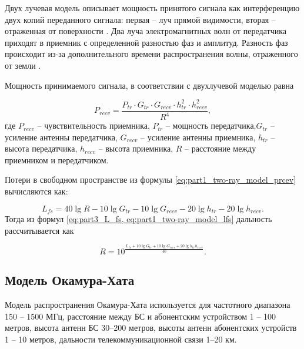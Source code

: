Двух лучевая модель описывает мощность принятого сигнала как интерференцию двух копий переданного сигнала: первая -- луч прямой видимости, вторая -- отраженная от поверхности \cite{Gaitan2020}. 
Два луча электромагнитных волн от передатчика приходят в приемник с определенной разностью фаз и амплитуд. Разность фаз происходит из-за дополнительного времени распространения волны, отраженного от земли \cite{Rademacher2016, Bacco2014, Zochmann2017, Kurt2017}. 


Мощность принимаемого сигнала, в соответствии с двухлучевой моделью равна

\begin{equation}
  \label{eq:part1_two-ray_model_prcev}
  P_{recv} = \frac{P_{tr} \cdot G_{tr} \cdot G_{recv} \cdot h^2_{tr} \cdot h^2_{recv}}{R^4},
\end{equation}
где $P_{recv}$ -- чувствительность приемника, $P_{tr}$ -- мощность передатчика,$G_{tr}$ -- усиление антенны передатчика, $G_{recv}$ -- усиление антенны приемника, $h_{tr}$ -- высота передатчика, $h_{recv}$ -- высота приемника, $R$ -- расстояние между приемником и передатчиком.

Потери в свободном пространстве из формулы \cref{eq:part1_two-ray_model_prcev} вычисляются как:

\begin{equation}
  \label{eq:part1_two-ray_model_lfs}
  L_{fs} = 40\lg{R} - 10\lg{G_{tr}} - 10\lg{G_{recv}} - 20\lg{h_{tr}} - 20\lg{h_{recv}}.
\end{equation}
Тогда из формул \cref{eq:part3_L_fs, eq:part1_two-ray_model_lfs} дальность рассчитывается как

\begin{equation}
  \label{eq:part1_two-ray_model_r}
  R = 10^\frac{L_{fs} + 10\lg{G_{tr}} + 10\lg{G_{recv}} + 20\lg{h_{tr}h_{recv}}}{40}.
\end{equation}



\subsection{Модель Окамура-Хата}

Модель распространения Окамура-Хата \cite{Hata1980} используется для частотного диапазона 150 -- 1500 МГц, расстояние между БС и абонентским устройством 1 -- 100 метров, высота антенн БС 30--200 метров, высоты антенн абонентских устройств 1 -- 10 метров, дальности телекоммуникационной связи 1--20 км.

